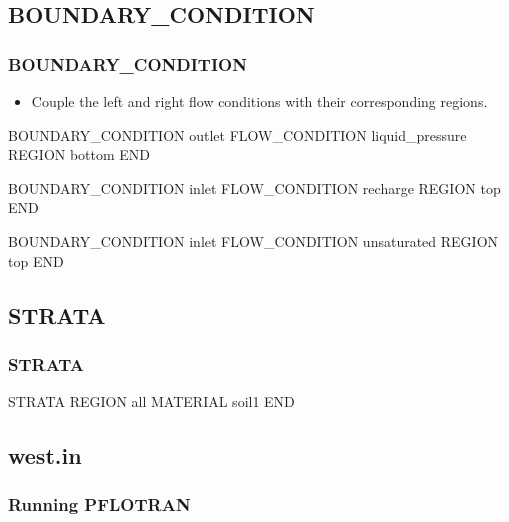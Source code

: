 \documentclass{beamer}
\newcommand\greencomment[1]{{{\color{green} #1}}}
\begin{document}
\subsection{BOUNDARY\_CONDITION}

\begin{frame}[fragile]\frametitle{BOUNDARY\_CONDITION}

\begin{itemize}
\item Couple the \greencomment{left} and \greencomment{right} flow conditions with their corresponding regions.
\end{itemize}

\begin{semiverbatim}
BOUNDARY_CONDITION outlet
  FLOW_CONDITION liquid_pressure
  REGION bottom
END

BOUNDARY_CONDITION inlet
  FLOW_CONDITION recharge
  REGION top
END

BOUNDARY_CONDITION inlet
  FLOW_CONDITION unsaturated
  REGION top
END
\end{semiverbatim}

\end{frame}


\subsection{STRATA}

\begin{frame}[fragile]\frametitle{STRATA}

\begin{semiverbatim}

STRATA
  REGION all
  MATERIAL soil1
END

\end{semiverbatim}

\end{frame}

\subsection{west.in}

\begin{frame}[fragile]\frametitle{Running PFLOTRAN}


\end{frame}
\end{document}
